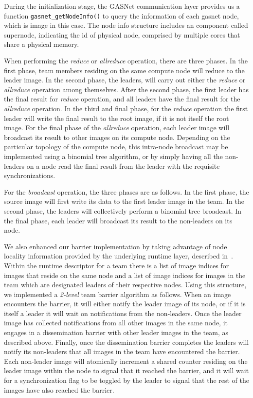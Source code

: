 During the initialization stage, the GASNet communication layer provides us a function \texttt{gasnet\_getNodeInfo()} to query the information of each gasnet node, which is image in this case. The node info structure includes an component called supernode, indicating the id of physical node, comprised by multiple cores that share a physical memory. 

When performing the \textit{reduce} or \textit{allreduce} operation, there are three phases. In
the first phase, team members residing on the same compute node will reduce to
the leader image. In the second phase, the leaders, will carry out either the
\textit{reduce} or \textit{allreduce} operation among themselves. After the second phase, the
first leader has the final result for \textit{reduce} operation, and all leaders have
the final result for the \textit{allreduce} operation. In the third and final phase,
for the \textit{reduce} operation the first leader will write the final result to the
root image, if it is not itself the root image. For the final phase of the
\textit{allreduce} operation, each leader image will broadcast its result to other
images on its compute node. Depending on the particular topology of the
compute node, this intra-node broadcast may be implemented using a binomial
tree algorithm, or by simply having all the non-leaders on a node read the
final result from the leader with the requisite synchronizations.

For the \textit{broadcast} operation, the three phases are as follows. In the first
phase, the source image will first write its data to the first leader image in
the team. In the second phase, the leaders will collectively perform a
binomial tree broadcast. In the final phase, each leader will broadcast its
result to the non-leaders on its node.

We also enhanced our barrier implementation by taking advantage of node
locality information provided by the underlying runtime layer, described
in~\cite{cafteams-cluster}.  Within the runtime descriptor for a team there is
a list of image indices for images that reside on the same node and a list of
image indices for images in the team which are designated leaders of their
respective nodes. Using this structure, we implemented a \textit{2-level} team
barrier algorithm as follows. When an image encounters the barrier, it will
either notify the leader image of its node, or if it is itself a leader it
will wait on notifications from the non-leaders. Once the leader image has
collected notifications from all other images in the same node, it engages in
a dissemination barrier with other leader images in the team, as described
above. Finally, once the dissemination barrier completes the leaders will
notify its non-leaders that all images in the team have encountered the
barrier. Each non-leader image will atomically increment a shared counter
residing on the leader image within the node to signal that it reached the
barrier, and it will wait for a synchronization flag to be toggled by the
leader to signal that the rest of the images have also reached the barrier.

